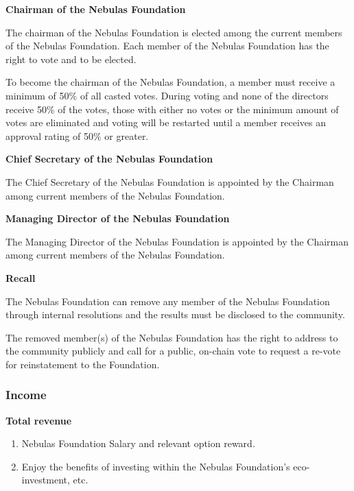 \vspace{2em}

\textbf{Chairman of the Nebulas Foundation}

The chairman of the Nebulas Foundation is elected among the current members of the Nebulas Foundation. Each member of the Nebulas Foundation has the right to vote and to be elected.

To become the chairman of the Nebulas Foundation, a member must receive a minimum of 50\% of all casted votes. During voting and none of the directors receive 50\% of the votes, those with either no votes or the minimum amount of votes are eliminated and voting will be restarted until a member receives an approval rating of 50\% or greater.

\vspace{2em}

\textbf{Chief Secretary of the Nebulas Foundation}

The Chief Secretary of the Nebulas Foundation is appointed by the Chairman among current members of the Nebulas Foundation.

\vspace{2em}

\textbf{Managing Director of the Nebulas Foundation}

The Managing Director of the Nebulas Foundation is appointed by the Chairman among current members of the Nebulas Foundation.

\vspace{2em}

\textbf{Recall}

The Nebulas Foundation can remove any member of the Nebulas Foundation through internal resolutions and the results must be disclosed to the community.

The removed member(s) of the Nebulas Foundation has the right to address to the community publicly and call for a public, on-chain vote to request a re-vote for reinstatement to the Foundation.

\subsubsection{Income}

\textbf{Total revenue}

\begin{enumerate}
	\item Nebulas Foundation Salary and relevant option reward.
    \item Enjoy the benefits of investing within the Nebulas Foundation’s eco-investment, etc.
\end{enumerate}

